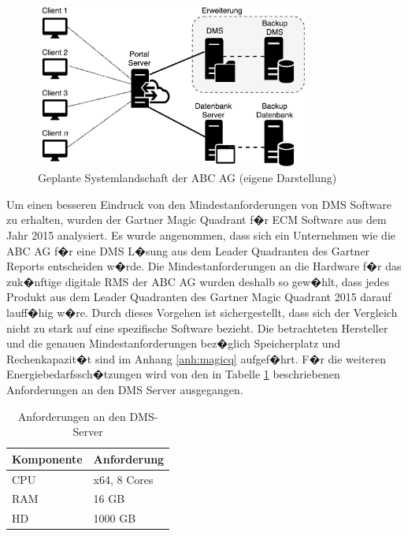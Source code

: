 \documentclass[a4paper,twoside,10pt]{report}
\begin{document}
\begin{figure}[htb]%
\centering
\includegraphics[width=0.8\textwidth]{zielsystem.pdf}%
\caption{Geplante Systemlandschaft der ABC AG (eigene Darstellung)}%
\label{img:zielsystem}%
\end{figure}

Um einen besseren Eindruck von den Mindestanforderungen von \ac{DMS} Software zu erhalten, wurden der Gartner Magic Quadrant f�r ECM Software aus dem Jahr 2015 analysiert. Es wurde angenommen, dass sich ein Unternehmen wie die ABC AG f�r eine \ac{DMS} L�sung aus dem Leader Quadranten des Gartner Reports entscheiden w�rde. Die Mindestanforderungen an die Hardware f�r das zuk�nftige digitale \ac{RMS} der ABC AG wurden deshalb so gew�hlt, dass jedes Produkt aus dem Leader Quadranten des Gartner Magic Quadrant 2015 darauf lauff�hig w�re. Durch dieses Vorgehen ist sichergestellt, dass sich der Vergleich nicht zu stark auf eine spezifische Software bezieht. Die betrachteten Hersteller und die genauen Mindestanforderungen bez�glich Speicherplatz und Rechenkapazit�t sind im Anhang \ref{anh:magicq} aufgef�hrt. F�r die weiteren Energiebedarfssch�tzungen wird von den in Tabelle \ref{tab:ecm-server} beschriebenen Anforderungen an den DMS Server ausgegangen. \cite{ecmmagic}

\begin{table}[htb]
	\begin{tabular}{l|l}
	\hline
	\textbf{Komponente} & \textbf{Anforderung}  \\
	\hline
	CPU		&	x64, 8 Cores \\
	RAM		&	16 GB	\\
	HD		&	1000	GB \\
	\hline
	\end{tabular}
\caption{Anforderungen an den DMS-Server}
\label{tab:ecm-server}
\end{table}
\end{document}
